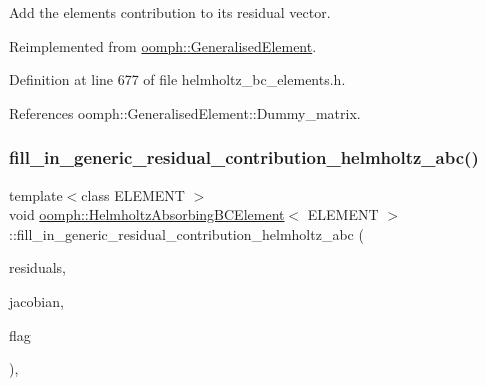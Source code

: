 Add the element\textquotesingle{}s contribution to its residual vector. 



Reimplemented from \hyperlink{classoomph_1_1GeneralisedElement_a310c97f515e8504a48179c0e72c550d7}{oomph\+::\+Generalised\+Element}.



Definition at line 677 of file helmholtz\+\_\+bc\+\_\+elements.\+h.



References oomph\+::\+Generalised\+Element\+::\+Dummy\+\_\+matrix.

\mbox{\label{classoomph_1_1HelmholtzAbsorbingBCElement_a25fb70fd99fc41f78f9afe6a3d8a445e}} 
\subsubsection{\texorpdfstring{fill\+\_\+in\+\_\+generic\+\_\+residual\+\_\+contribution\+\_\+helmholtz\+\_\+abc()}{fill\_in\_generic\_residual\_contribution\_helmholtz\_abc()}}
{\footnotesize\ttfamily template$<$class E\+L\+E\+M\+E\+NT $>$ \\
void \hyperlink{classoomph_1_1HelmholtzAbsorbingBCElement}{oomph\+::\+Helmholtz\+Absorbing\+B\+C\+Element}$<$ E\+L\+E\+M\+E\+NT $>$\+::fill\+\_\+in\+\_\+generic\+\_\+residual\+\_\+contribution\+\_\+helmholtz\+\_\+abc (\begin{DoxyParamCaption}\item[{\hyperlink{classoomph_1_1Vector}{Vector}$<$ double $>$ \&}]{residuals,  }\item[{\hyperlink{classoomph_1_1DenseMatrix}{Dense\+Matrix}$<$ double $>$ \&}]{jacobian,  }\item[{const unsigned \&}]{flag }\end{DoxyParamCaption})\hspace{0.3cm}{\ttfamily [inline]}, {\ttfamily [private]}}



